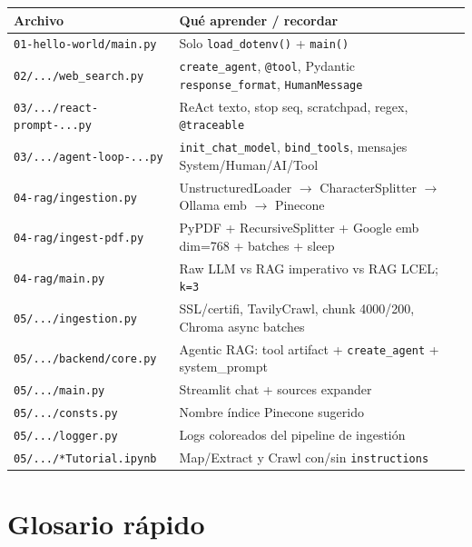 \documentclass[11pt,a4paper]{article}
\begin{document}
\begin{longtable}{@{}p{5.4cm}p{9.8cm}@{}}
\toprule
\textbf{Archivo} & \textbf{Qué aprender / recordar} \\
\midrule
\endhead
\texttt{01-hello-world/main.py} & Solo \texttt{load\_dotenv()} + \texttt{main()} \\
\texttt{02/.../web\_search.py} & \texttt{create\_agent}, \texttt{@tool}, Pydantic \texttt{response\_format}, \texttt{HumanMessage} \\
\texttt{03/.../react-prompt-...py} & ReAct texto, stop seq, scratchpad, regex, \texttt{@traceable} \\
\texttt{03/.../agent-loop-...py} & \texttt{init\_chat\_model}, \texttt{bind\_tools}, mensajes System/Human/AI/Tool \\
\texttt{04-rag/ingestion.py} & UnstructuredLoader $\to$ CharacterSplitter $\to$ Ollama emb $\to$ Pinecone \\
\texttt{04-rag/ingest-pdf.py} & PyPDF + RecursiveSplitter + Google emb dim=768 + batches + sleep \\
\texttt{04-rag/main.py} & Raw LLM vs RAG imperativo vs RAG LCEL; \texttt{k=3} \\
\texttt{05/.../ingestion.py} & SSL/certifi, TavilyCrawl, chunk 4000/200, Chroma async batches \\
\texttt{05/.../backend/core.py} & Agentic RAG: tool artifact + \texttt{create\_agent} + system\_prompt \\
\texttt{05/.../main.py} & Streamlit chat + sources expander \\
\texttt{05/.../consts.py} & Nombre índice Pinecone sugerido \\
\texttt{05/.../logger.py} & Logs coloreados del pipeline de ingestión \\
\texttt{05/.../*Tutorial.ipynb} & Map/Extract y Crawl con/sin \texttt{instructions} \\
\bottomrule
\end{longtable}

\section{Glosario rápido}
\end{document}
